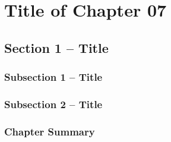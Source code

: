 \chapter{Title of Chapter 07}
\label{chap:ExperimenatlValidation} 

\section{Section 1 -- Title\label{sec:C7_HSRValidation}}


\subsection{Subsection 1 -- Title}\label{sub:exp_setup}

\lipsum[1]  	



\subsection{Subsection 2 -- Title}\label{sub:expStiffnessRange}

\lipsum[1]  

\subsection{Chapter Summary}\label{sec:Conclusions}

\lipsum[1] 
